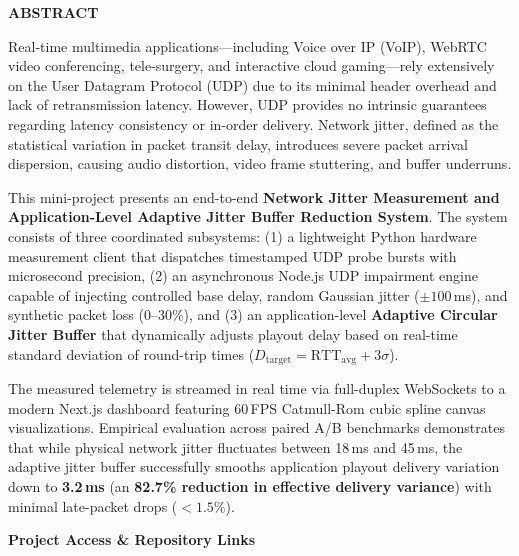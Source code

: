 \documentclass[12pt, a4paper]{report}
\begin{document}
\vspace{0.6cm}
\begin{center}
    {\Large\bfseries ABSTRACT\par}
\end{center}
\vspace{0.3cm}

Real-time multimedia applications---including Voice over IP (VoIP), WebRTC video conferencing, tele-surgery, and interactive cloud gaming---rely extensively on the User Datagram Protocol (UDP) due to its minimal header overhead and lack of retransmission latency. However, UDP provides no intrinsic guarantees regarding latency consistency or in-order delivery. Network jitter, defined as the statistical variation in packet transit delay, introduces severe packet arrival dispersion, causing audio distortion, video frame stuttering, and buffer underruns.

This mini-project presents an end-to-end \textbf{Network Jitter Measurement and Application-Level Adaptive Jitter Buffer Reduction System}. The system consists of three coordinated subsystems: (1) a lightweight Python hardware measurement client that dispatches timestamped UDP probe bursts with microsecond precision, (2) an asynchronous Node.js UDP impairment engine capable of injecting controlled base delay, random Gaussian jitter ($\pm 100$\,ms), and synthetic packet loss (0--30\%), and (3) an application-level \textbf{Adaptive Circular Jitter Buffer} that dynamically adjusts playout delay based on real-time standard deviation of round-trip times ($D_{\text{target}} = \text{RTT}_{\text{avg}} + 3\sigma$).

The measured telemetry is streamed in real time via full-duplex WebSockets to a modern Next.js dashboard featuring 60\,FPS Catmull-Rom cubic spline canvas visualizations. Empirical evaluation across paired A/B benchmarks demonstrates that while physical network jitter fluctuates between 18\,ms and 45\,ms, the adaptive jitter buffer successfully smooths application playout delivery variation down to \textbf{3.2\,ms} (an \textbf{82.7\% reduction in effective delivery variance}) with minimal late-packet drops ($<1.5\%$).

\vspace{0.6cm}
\noindent\textbf{\large Project Access \& Repository Links}
\vspace{0.3cm}
\end{document}
